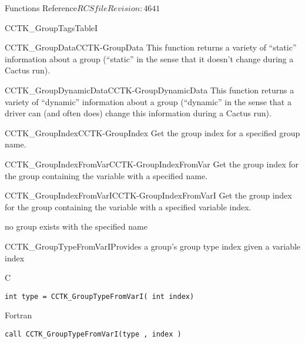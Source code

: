\begin{cactuspart}{ Functions Reference}{$RCSfile$}{$Revision: 4641 $}
\begin{FunctionDescription}{CCTK\_GroupTagsTableI}
\begin{SeeAlsoSection}
\begin{SeeAlso2}{CCTK\_GroupData}{CCTK-GroupData}
This function returns a variety of ``static'' information about a group
(``static'' in the sense that it doesn't change during a Cactus run).
\end{SeeAlso2}
\begin{SeeAlso2}{CCTK\_GroupDynamicData}{CCTK-GroupDynamicData}
This function returns a variety of ``dynamic'' information about a group
(``dynamic'' in the sense that a driver can (and often does) change this
information during a Cactus run).
\end{SeeAlso2}
\begin{SeeAlso2}{CCTK\_GroupIndex}{CCTK-GroupIndex}
Get the group index for a specified group name.
\end{SeeAlso2}
\begin{SeeAlso2}{CCTK\_GroupIndexFromVar}{CCTK-GroupIndexFromVar}
Get the group index for the group containing the variable with
a specified name.
\end{SeeAlso2}
\begin{SeeAlso2}{CCTK\_GroupIndexFromVarI}{CCTK-GroupIndexFromVarI}
Get the group index for the group containing the variable with
a specified variable index.
\end{SeeAlso2}
\end{SeeAlsoSection}

\begin{ErrorSection}
\begin{Error}{-1}
no group exists with the specified name
\end{Error}
\end{ErrorSection}
\end{FunctionDescription}



\begin{FunctionDescription}{CCTK\_GroupTypeFromVarI}{Provides a group's group type
               index given a variable index}
\label{CCTK-GroupTypeFromVarI}
\begin{SynopsisSection}
\begin{Synopsis}{C}
\begin{verbatim}int type = CCTK_GroupTypeFromVarI( int index)\end{verbatim}
\end{Synopsis}
\begin{Synopsis}{Fortran}
\begin{verbatim}call CCTK_GroupTypeFromVarI(type , index )


\end{verbatim}
\end{Synopsis}
\end{SynopsisSection}
\end{FunctionDescription}
\end{cactuspart}

